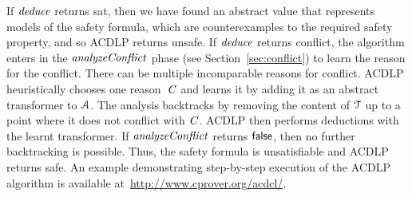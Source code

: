 If  $\mathit{deduce}$ returns  \textsf{sat}, then we have found an abstract value 
that represents models of the safety formula, which are counterexamples 
to the required safety property, and so ACDLP returns \textsf{unsafe}.
%
%
If  $\mathit{deduce}$ returns  \textsf{conflict}, 
the algorithm enters in the $\mathit{analyzeConflict}$ 
phase (see Section~\ref{sec:conflict}) to learn the reason for the conflict.   There can be multiple
incomparable reasons for conflict.
ACDLP heuristically chooses one reason~$\mathit{C}$ and learns it 
by adding it as an abstract transformer to $\mathcal{A}$. The analysis 
backtracks by removing the content of $\mathcal{T}$ up to a point where it does not 
conflict with $\mathit{C}$.  ACDLP then performs deductions with the learnt 
transformer.  If $\mathit{analyzeConflict}$ returns $\mathsf{false}$, then no further
backtracking is possible.  Thus, the safety formula is unsatisfiable
and ACDLP returns \textsf{safe}.  An example demonstrating step-by-step 
execution of the ACDLP algorithm is available at~\url{http://www.cprover.org/acdcl/}.


